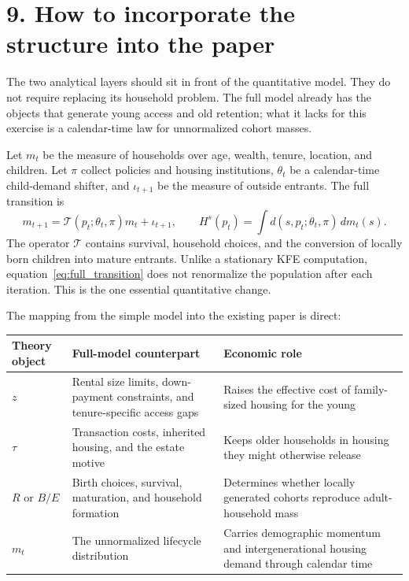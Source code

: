 \documentclass[11pt]{article}
\theoremstyle{definition}
\begin{document}
\section*{9. How to incorporate the structure into the paper}

The two analytical layers should sit in front of the quantitative model. They
do not require replacing its household problem. The full model already has the
objects that generate young access and old retention; what it lacks for this
exercise is a calendar-time law for unnormalized cohort masses.

Let $m_t$ be the measure of households over age, wealth, tenure, location, and
children. Let $\pi$ collect policies and housing institutions, $\theta_t$ be a
calendar-time child-demand shifter, and $\iota_{t+1}$ be the measure of outside
entrants. The full transition is
\begin{equation}
 m_{t+1}=\mathcal T(p_t;\theta_t,\pi)m_t+\iota_{t+1},
 \qquad
 H^s(p_t)=\int d(s,p_t;\theta_t,\pi)\,dm_t(s).
 \label{eq:full_transition}
\end{equation}
The operator $\mathcal T$ contains survival, household choices, and the
conversion of locally born children into mature entrants. Unlike a stationary
KFE computation, equation~\eqref{eq:full_transition} does not renormalize the
population after each iteration. This is the one essential quantitative
change.

The mapping from the simple model into the existing paper is direct:

\begin{center}
\small
\begin{tabularx}{0.96\textwidth}{@{}
>{\raggedright\arraybackslash}p{}
>{\raggedright\arraybackslash}p{}
>{\raggedright\arraybackslash}X@{}}
\toprule
Theory object & Full-model counterpart & Economic role \\
\midrule
$z$ & Rental size limits, down-payment constraints, and tenure-specific
access gaps & Raises the effective cost of family-sized housing for the young \\
$\tau$ & Transaction costs, inherited housing, and the estate motive & Keeps
older households in housing they might otherwise release \\
$R$ or $B/E$ & Birth choices, survival, maturation, and household formation &
Determines whether locally generated cohorts reproduce adult-household mass \\
$m_t$ & The unnormalized lifecycle distribution & Carries demographic
momentum and intergenerational housing demand through calendar time \\
\bottomrule
\end{tabularx}
\end{center}
\end{document}
